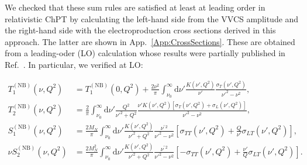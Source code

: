 \documentclass[twocolumn,prc,showpacs,nofootinbib,preprintnumbers,amsmath,amssymb,superscriptaddress]{revtex4-1}
\def\dd{\mathrm{d}}
\begin{document}
We checked that these sum rules are satisfied at least at leading order in relativistic ChPT by calculating the left-hand side from the VVCS amplitude and the right-hand side with the electroproduction cross sections derived in this approach. 
The latter are shown in App.~\ref{App:CrossSections}. 
These are obtained from a leading-oder (LO) calculation whose results were partially published in Ref.~\cite{Alarcon:2013cba}. In particular, we verified at LO:
\begin{widetext}
\begin{subequations}
\begin{align}
T^{(\mathrm{NB})}_1(\nu,Q^2)&= T^{(\mathrm{NB})}_1(0,Q^2) + \frac{2 \nu^2}{ \pi}\int_{\nu_0}^{\infty}\!\! \dd\nu' \frac{K(\nu',Q^2)}{\nu'}\frac{\sigma_T(\nu',Q^2)}{\nu'^2-\nu^2} \label{Eq:T1disp}, \\
T^{(\mathrm{NB})}_2(\nu,Q^2)&= \frac{2}{\pi}\int_{\nu_0}^{\infty}\!\! \dd\nu'  \frac{ Q^2}{\nu'^2+Q^2} \frac{\nu' K(\nu',Q^2)[\sigma_T(\nu',Q^2)+\sigma_L(\nu',Q^2)]}{\nu'^2-\nu^2}\label{Eq:T2disp}, \\
S^{(\mathrm{NB})}_1(\nu,Q^2)&= \frac{2M_N}{\pi}\int_{\nu_0}^{\infty}\!\! \dd\nu'  \frac{ K(\nu',Q^2)}{\nu'^2+Q^2} \frac{ \nu^{\prime\, 2}}{\nu'^2-\nu^2} [\sigma_{TT}(\nu',Q^2)+\frac{Q}{\nu'}\sigma_{LT}(\nu',Q^2)]\label{Eq:S1disp},\\
\nu S^{(\mathrm{NB})}_2(\nu,Q^2)&= \frac{2 M_N^2}{\pi}\int_{\nu_0}^{\infty}\!\! \dd\nu'  \frac{ K(\nu',Q^2)}{\nu'^2+Q^2} \frac{ \nu^{\prime\, 2}}{\nu'^2-\nu^2} [-\sigma_{TT}(\nu',Q^2)+\frac{\nu'}{Q}\sigma_{LT}(\nu',Q^2)]\label{Eq:T2disp}.
\end{align}
\end{subequations}

\end{widetext}
\end{document}
